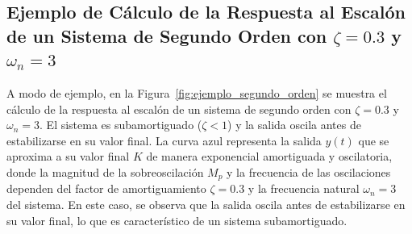 \subsection{Ejemplo de Cálculo de la Respuesta al Escalón de un Sistema de Segundo Orden con $\zeta = 0.3$ y $\omega_n = 3$}\label{sec:ejemplo_segundo_orden}

A modo de ejemplo, en la Figura~\ref{fig:ejemplo_segundo_orden} se muestra el cálculo de la respuesta al escalón de un sistema de segundo orden con $\zeta = 0.3$ y $\omega_n = 3$. El sistema es subamortiguado ($\zeta < 1$) y la salida oscila antes de estabilizarse en su valor final. La curva azul representa la salida $y(t)$ que se aproxima a su valor final $K$ de manera exponencial amortiguada y oscilatoria, donde la magnitud de la sobreoscilación $M_p$ y la frecuencia de las oscilaciones dependen del factor de amortiguamiento $\zeta=0.3$ y la frecuencia natural $\omega_n=3$ del sistema. En este caso, se observa que la salida oscila antes de estabilizarse en su valor final, lo que es característico de un sistema subamortiguado.

